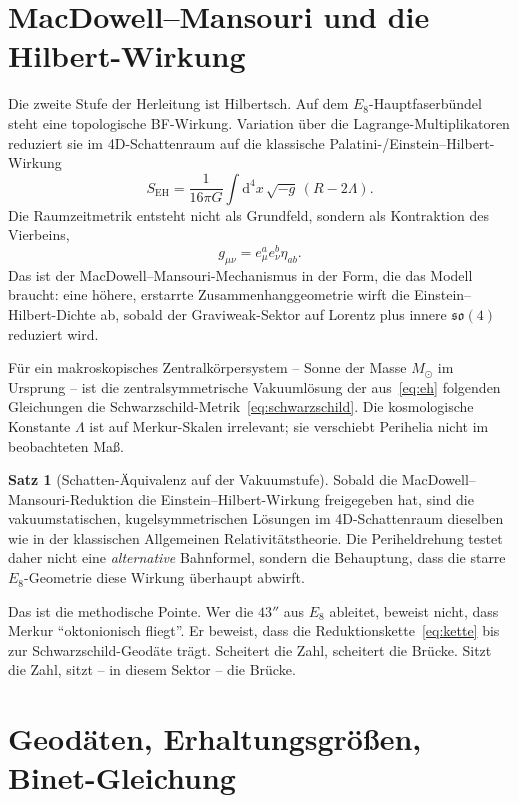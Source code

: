 \documentclass[11pt,a4paper]{article}
\theoremstyle{definition}
\newtheorem{satz}{Satz}[section]
\theoremstyle{remark}
\newcommand{\so}{\mathfrak{so}}
\newcommand{\eh}{S_{\mathrm{EH}}}
\newcommand{\MS}{M_{\odot}}
\begin{document}
\section{MacDowell--Mansouri und die Hilbert-Wirkung}

Die zweite Stufe der Herleitung ist Hilbertsch. Auf dem \(E_8\)-Hauptfaserbündel steht eine topologische BF-Wirkung. Variation über die Lagrange-Multiplikatoren reduziert sie im 4D-Schattenraum auf die klassische Palatini-/Einstein--Hilbert-Wirkung
\begin{equation}
\label{eq:eh}
\eh=\frac{1}{16\pi G}\int\mathrm{d}^4x\,\sqrt{-g}\,(R-2\Lambda).
\end{equation}
Die Raumzeitmetrik entsteht nicht als Grundfeld, sondern als Kontraktion des Vierbeins,
\begin{equation}
g_{\mu\nu}=e_\mu^a e_\nu^b\eta_{ab}.
\end{equation}
Das ist der MacDowell--Mansouri-Mechanismus in der Form, die das Modell braucht: eine höhere, erstarrte Zusammenhanggeometrie wirft die Einstein--Hilbert-Dichte ab, sobald der Graviweak-Sektor auf Lorentz plus innere \(\so(4)\) reduziert wird.

Für ein makroskopisches Zentralkörpersystem -- Sonne der Masse \(\MS\) im Ursprung -- ist die zentralsymmetrische Vakuumlösung der aus~\eqref{eq:eh} folgenden Gleichungen die Schwarzschild-Metrik~\eqref{eq:schwarzschild}. Die kosmologische Konstante \(\Lambda\) ist auf Merkur-Skalen irrelevant; sie verschiebt Perihelia nicht im beobachteten Maß.

\begin{satz}[Schatten-Äquivalenz auf der Vakuumstufe]
Sobald die MacDowell--Mansouri-Reduktion die Einstein--Hilbert-Wirkung freigegeben hat, sind die vakuumstatischen, kugelsymmetrischen Lösungen im 4D-Schattenraum dieselben wie in der klassischen Allgemeinen Relativitätstheorie. Die Periheldrehung testet daher nicht eine \emph{alternative} Bahnformel, sondern die Behauptung, dass die starre \(E_8\)-Geometrie diese Wirkung überhaupt abwirft.
\end{satz}

Das ist die methodische Pointe. Wer die \(43''\) aus \(E_8\) ableitet, beweist nicht, dass Merkur \enquote{oktonionisch fliegt}. Er beweist, dass die Reduktionskette~\eqref{eq:kette} bis zur Schwarzschild-Geodäte trägt. Scheitert die Zahl, scheitert die Brücke. Sitzt die Zahl, sitzt -- in diesem Sektor -- die Brücke.

\section{Geodäten, Erhaltungsgrößen, Binet-Gleichung}
\end{document}
